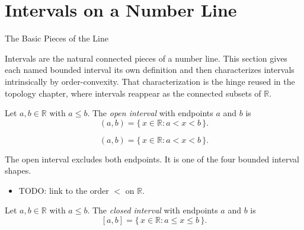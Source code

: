 \section{Intervals on a Number Line}
\label{sec:intervals-on-a-number-line}

\begin{topicbox}{The Basic Pieces of the Line}
\begin{exposition}
Intervals are the natural connected pieces of a number line. This section gives each named bounded interval its own definition and then characterizes intervals intrinsically by order-convexity. That characterization is the hinge reused in the topology chapter, where intervals reappear as the connected subsets of $\mathbb{R}$.
\end{exposition}
\end{topicbox}
\begin{tcolorbox}[colback=defbox, colframe=defborder, arc=2pt,
  left=6pt, right=6pt, top=4pt, bottom=4pt,
  title={\small\textbf{Definition (Open Interval)}},
  fonttitle=\small\bfseries]
\begin{definition}
\label{def:open-interval}
Let $a,b\in\mathbb{R}$ with $a\le b$. The \emph{open interval} with endpoints $a$ and $b$ is
\[
(a,b)=\{\,x\in\mathbb{R} : a<x<b\,\}.
\]
\end{definition}
\end{tcolorbox}
\begin{remark*}
\[
(a,b)=\{\,x\in\mathbb{R} : a<x<b\,\}.
\]
\end{remark*}
\begin{remark*}[Interpretation]
The open interval excludes both endpoints. It is one of the four bounded interval shapes.
\end{remark*}
\begin{dependencies}
\begin{itemize}
  \item TODO: link to the order $<$ on $\mathbb{R}$.
\end{itemize}
\end{dependencies}
\begin{tcolorbox}[colback=defbox, colframe=defborder, arc=2pt,
  left=6pt, right=6pt, top=4pt, bottom=4pt,
  title={\small\textbf{Definition (Closed Interval)}},
  fonttitle=\small\bfseries]
\begin{definition}
\label{def:closed-interval}
Let $a,b\in\mathbb{R}$ with $a\le b$. The \emph{closed interval} with endpoints $a$ and $b$ is
\[
[a,b]=\{\,x\in\mathbb{R} : a\le x\le b\,\}.
\]
\end{definition}
\end{tcolorbox}
